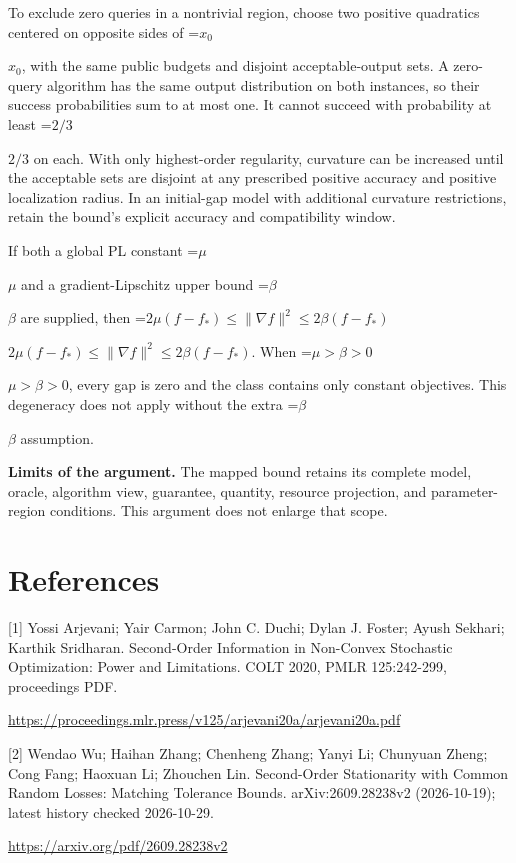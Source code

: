 \documentclass[10pt,a4paper]{article}
\newcommand{\AtlasMath}[1]{\par\begingroup\centering\setbox0=\hbox{$\displaystyle #1$}\ifdim\wd0>1.4\linewidth\typeout{ATLAS WIDE FORMULA: \the\wd0}\fi\ifdim\wd0>\linewidth\resizebox{\linewidth}{!}{\box0}\else\box0\fi\par\endgroup}
\newcommand{\AtlasInlineMath}[1]{\begingroup\setbox0=\hbox{$#1$}\ifdim\wd0>.4\linewidth\endgroup\AtlasMath{#1}\else\endgroup$#1$\fi}
\begin{document}
To exclude zero queries in a nontrivial region, choose two positive quadratics centered on opposite sides of \AtlasInlineMath{x_0}, with the same public budgets and disjoint acceptable-output sets. A zero-query algorithm has the same output distribution on both instances, so their success probabilities sum to at most one. It cannot succeed with probability at least \AtlasInlineMath{2/3} on each. With only highest-order regularity, curvature can be increased until the acceptable sets are disjoint at any prescribed positive accuracy and positive localization radius. In an initial-gap model with additional curvature restrictions, retain the bound's explicit accuracy and compatibility window.

If both a global PL constant \AtlasInlineMath{\mu} and a gradient-Lipschitz upper bound \AtlasInlineMath{\beta} are supplied, then \AtlasInlineMath{2\mu(f-f_*)\le\|\nabla f\|^2\le2\beta(f-f_*)}. When \AtlasInlineMath{\mu>\beta>0}, every gap is zero and the class contains only constant objectives. This degeneracy does not apply without the extra \AtlasInlineMath{\beta} assumption.

\textbf{Limits of the argument.} The mapped bound retains its complete model, oracle, algorithm view, guarantee, quantity, resource projection, and parameter-region conditions. This argument does not enlarge that scope.

\section{References}
[1] Yossi Arjevani; Yair Carmon; John C. Duchi; Dylan J. Foster; Ayush Sekhari; Karthik Sridharan. Second-Order Information in Non-Convex Stochastic Optimization: Power and Limitations. COLT 2020, PMLR 125:242-299, proceedings PDF.

\url{https://proceedings.mlr.press/v125/arjevani20a/arjevani20a.pdf}

[2] Wendao Wu; Haihan Zhang; Chenheng Zhang; Yanyi Li; Chunyuan Zheng; Cong Fang; Haoxuan Li; Zhouchen Lin. Second-Order Stationarity with Common Random Losses: Matching Tolerance Bounds. arXiv:2609.28238v2 (2026-10-19); latest history checked 2026-10-29.

\url{https://arxiv.org/pdf/2609.28238v2}
\end{document}
